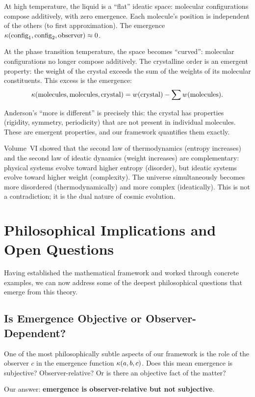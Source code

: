 At high temperature, the liquid is a ``flat'' ideatic space: molecular
configurations compose additively, with zero emergence. Each molecule's
position is independent of the others (to first approximation). The emergence
$\kappa(\text{config}_1, \text{config}_2, \text{observer}) \approx 0$.

At the phase transition temperature, the space becomes ``curved'': molecular
configurations no longer compose additively. The crystalline order is an
emergent property: the weight of the crystal exceeds the sum of the weights
of its molecular constituents. This excess is the emergence:
\[
  \kappa(\text{molecules}, \text{molecules}, \text{crystal})
  = w(\text{crystal}) - \sum w(\text{molecules}).
\]

Anderson's ``more is different'' is precisely this: the crystal has properties
(rigidity, symmetry, periodicity) that are not present in individual molecules.
These are emergent properties, and our framework quantifies them exactly.

Volume~VI showed that the second law of thermodynamics (entropy increases)
and the second law of ideatic dynamics (weight increases) are complementary:
physical systems evolve toward higher entropy (disorder), but ideatic systems
evolve toward higher weight (complexity). The universe simultaneously becomes
more disordered (thermodynamically) and more complex (ideatically). This is
not a contradiction; it is the dual nature of cosmic evolution.


\section{Philosophical Implications and Open Questions}

Having established the mathematical framework and worked through concrete
examples, we can now address some of the deepest philosophical questions that
emerge from this theory.

\subsection{Is Emergence Objective or Observer-Dependent?}

One of the most philosophically subtle aspects of our framework is the role
of the observer $c$ in the emergence function $\kappa(a, b, c)$. Does this
mean emergence is subjective? Observer-relative? Or is there an objective fact
of the matter?

Our answer: \textbf{emergence is observer-relative but not subjective}.

